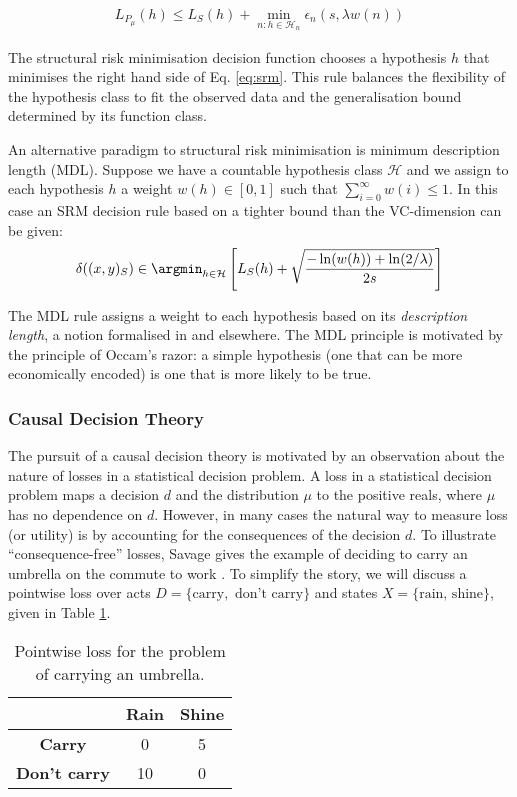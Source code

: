 \begin{align}
    L_{P_\mu}(h) \leq L_S(h) + \min_{n:h\in \mathcal{H}_n}\epsilon_n(s,\lambda w(n)) \label{eq:srm}
\end{align}

The structural risk minimisation decision function chooses a hypothesis $h$ that minimises the right hand side of Eq. \ref{eq:srm}. This rule balances the flexibility of the hypothesis class to fit the observed data and the generalisation bound determined by its function class. 

An alternative paradigm to structural risk minimisation is minimum description length (MDL). Suppose we have a countable hypothesis class $\mathcal{H}$ and we assign to each hypothesis $h$ a weight $w(h)\in [0,1]$ such that $\sum_{i=0}^\infty w(i)\leq 1$. In this case an SRM decision rule based on a tighter bound than the VC-dimension can be given:
\begin{align}
    \delta((x,y)_S)\in \argmin_{h\in \mathcal{H}} \left[ L_S(h) + \sqrt{\frac{-\ln(w(h))+\ln(2/\lambda)}{2s}}\right]
\end{align}

The MDL rule assigns a weight to each hypothesis based on its \emph{description length}, a notion formalised in \cite{shalev-shwartz_understanding_2014} and elsewhere. The MDL principle is motivated by the principle of Occam's razor: a simple hypothesis (one that can be more economically encoded) is one that is more likely to be true.

\subsubsection{Causal Decision Theory}\label{ssec:CDT}

The pursuit of a causal decision theory is motivated by an observation about the nature of losses in a statistical decision problem. A loss in a statistical decision problem maps a decision $d$ and the distribution $\mu$ to the positive reals, where $\mu$ has no dependence on $d$. However, in many cases the natural way to measure loss (or utility) is by accounting for the consequences of the decision $d$. To illustrate ``consequence-free'' losses, Savage gives the example of deciding to carry an umbrella on the commute to work \cite{savage_theory_1951}. To simplify the story, we will discuss a pointwise loss over acts $D=\{\text{carry},\text{ don't carry}\}$ and states $X=\{\text{rain, }\text{shine}\}$, given in Table \ref{tab:umbrella}.
\begin{table}[h]
    \centering
        \begin{tabular}{ | c | c | c | }
        \hline
                              & \textbf{Rain} & \textbf{Shine} \\ 
                              \hline
         \textbf{Carry}       & 0 & 5 \\  
         \textbf{Don't carry} & 10 & 0   \\ 
         \hline
        \end{tabular}
    \caption{Pointwise loss for the problem of carrying an umbrella.}
    \label{tab:umbrella}
\end{table}

